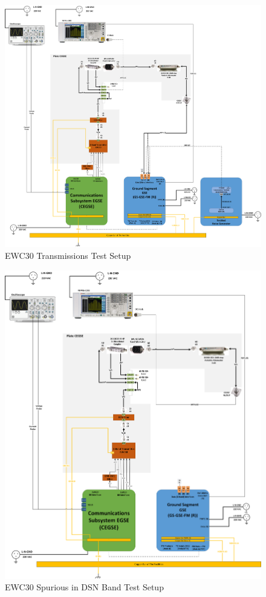\begin{figure}[H]\centering
	\includegraphics[width=1\linewidth]{figuras/EWC30-PXA-Setup1.png}  
	\caption{EWC30 Transmissions Test Setup }
  \label{fig:data-setup1}
\end{figure}

\begin{figure}[H]\centering
	\includegraphics[width=1\linewidth]{figuras/EWC30-PXA-Setup2.png}  
	\caption{EWC30 Spurious in DSN Band Test Setup}
  \label{fig:data-setup2}
\end{figure}

